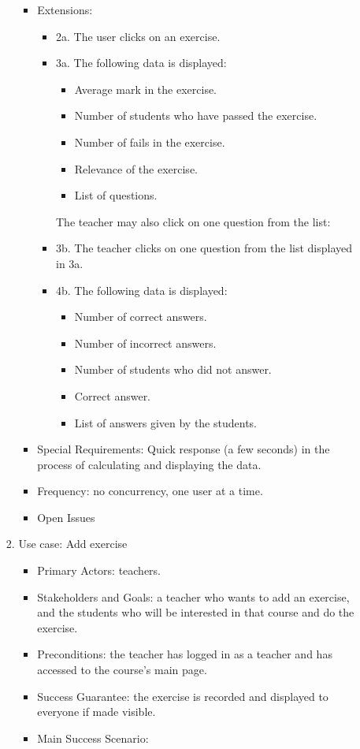 \documentclass{article}
\begin{document}
\begin{enumerate}
\begin{enumerate}
\begin{enumerate}
\begin{itemize}
\begin{itemize}
					\end{itemize}
				\item Extensions: 
					\begin{itemize}
						\item 2a. The user clicks on an exercise.
						\item 3a. The following data is displayed:
							\begin{itemize}
								\item Average mark in the exercise.
								\item Number of students who have passed the exercise.
								\item Number of fails in the exercise.
								\item Relevance of the exercise.
								\item List of questions.
							\end{itemize}
						The teacher may also click on one question from the list: \\
							\item 3b. The teacher clicks on one question from the list displayed in 3a.
							\item 4b. The following data is displayed:
								\begin{itemize}
									\item Number of correct answers.
									\item Number of incorrect answers.
									\item Number of students who did not answer.
									\item Correct answer.
									\item List of answers given by the students.
								\end{itemize}
					\end{itemize}
				\item Special Requirements: Quick response (a few seconds) in the process of calculating and displaying the data.
				\item Frequency: no concurrency, one user at a time.
				\item Open Issues
			\end{itemize}
			\item{Use case: Add exercise}
			\begin{itemize}
				\item Primary Actors: teachers.
				\item Stakeholders and Goals: a teacher who wants to add an exercise, and the students who will be interested in that course and do the exercise.
				\item Preconditions: the teacher has logged in as a teacher and has accessed to the course's main page.
				\item Success Guarantee: the exercise is recorded and displayed to everyone if made visible.
				\item Main Success Scenario:
					

\end{itemize}
\end{enumerate}
\end{enumerate}
\end{enumerate}
\end{document}
